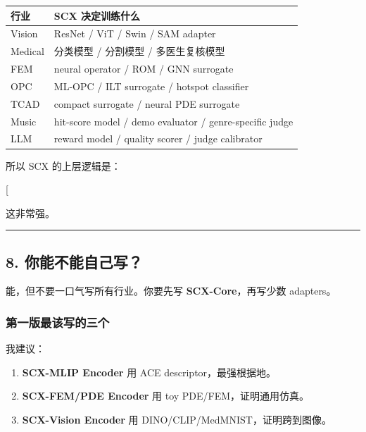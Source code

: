 \documentclass[
  12pt,
]{ctexart}
\begin{document}
\begin{longtable}[]{@{}
  >{\raggedright\arraybackslash}p{}
  >{\raggedright\arraybackslash}p{}@{}}
\toprule\noalign{}
\begin{minipage}[b]{\linewidth}\raggedright
行业
\end{minipage} & \begin{minipage}[b]{\linewidth}\raggedright
SCX 决定训练什么
\end{minipage} \\
\midrule\noalign{}
\endhead
\bottomrule\noalign{}
\endlastfoot
Vision & ResNet / ViT / Swin / SAM adapter \\
Medical & 分类模型 / 分割模型 / 多医生复核模型 \\
FEM & neural operator / ROM / GNN surrogate \\
OPC & ML-OPC / ILT surrogate / hotspot classifier \\
TCAD & compact surrogate / neural PDE surrogate \\
Music & hit-score model / demo evaluator / genre-specific judge \\
LLM & reward model / quality scorer / judge calibrator \\
\end{longtable}

所以 SCX 的上层逻辑是：

{[}  \rightarrow {} \rightarrow
{} \rightarrow \text{蒸馏/部署}{]}

这非常强。

\begin{center}\rule{0.5\linewidth}{0.5pt}\end{center}

\subsection{8.
你能不能自己写？}\label{ux4f60ux80fdux4e0dux80fdux81eaux5df1ux5199}

能，但不要一口气写所有行业。你要先写 \textbf{SCX-Core}，再写少数
adapters。

\subsubsection{第一版最该写的三个}\label{ux7b2cux4e00ux7248ux6700ux8be5ux5199ux7684ux4e09ux4e2a}

我建议：

\begin{enumerate}
\def\labelenumi{\arabic{enumi}.}
\item
  \textbf{SCX-MLIP Encoder} 用 ACE descriptor，最强根据地。
\item
  \textbf{SCX-FEM/PDE Encoder} 用 toy PDE/FEM，证明通用仿真。
\item
  \textbf{SCX-Vision Encoder} 用 DINO/CLIP/MedMNIST，证明跨到图像。
\end{enumerate}
\end{document}
